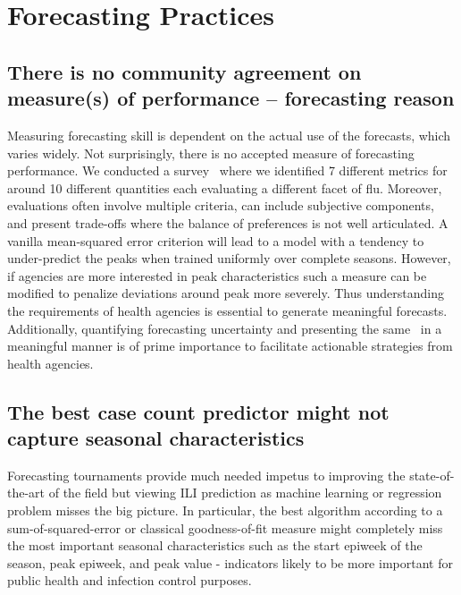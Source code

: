 \documentclass[10pt,letterpaper]{article}
\begin{document}
\section*{Forecasting Practices}

\subsection*{There is no community agreement on measure(s) of performance
– forecasting reason}
Measuring forecasting skill is dependent on the actual use of the forecasts,
which varies widely. Not surprisingly, there is no accepted measure of
forecasting performance. We conducted a survey~\cite{matsubara2014funnel} where
we identified 7 different metrics for around 10 different quantities each
evaluating a different facet of flu. Moreover, evaluations often involve
multiple criteria, can include subjective components, and present trade-offs
where the balance of preferences is not well articulated. A vanilla
mean-squared error criterion will lead to a model with a tendency to
under-predict the peaks when trained uniformly over complete seasons. However,
if agencies are more interested in peak characteristics such a measure can be
modified to penalize deviations around peak more severely. Thus understanding
the requirements of health agencies is essential to generate meaningful
forecasts. Additionally, quantifying forecasting uncertainty and presenting the
same~\cite{tabataba2015smq} in a meaningful manner is of prime importance to
facilitate actionable strategies from health agencies.

\subsection*{The best case count predictor might not capture seasonal characteristics}
Forecasting tournaments provide much needed impetus to improving the
state-of-the-art of the field but viewing ILI prediction as machine learning or
regression problem misses the big picture. In particular, the best algorithm
according to a sum-of-squared-error or classical goodness-of-fit measure might
completely miss the most important seasonal characteristics such as the start
epiweek of the season, peak epiweek, and peak value - indicators likely to be
more important for public health and infection control purposes. 
\end{document}
